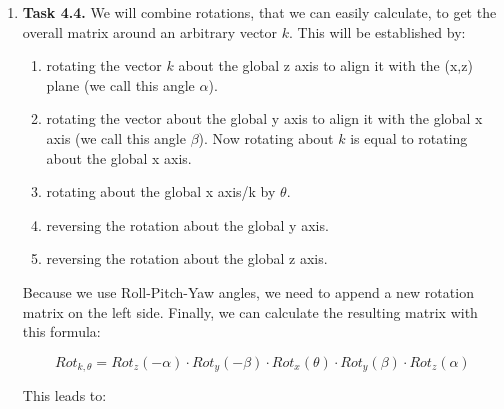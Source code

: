 \documentclass[a4paper,11pt]{article}
\begin{document}
\begin {enumerate}
	\item[\textbf{Task 4.4.}]
		We will combine rotations, that we can easily calculate, to get the overall matrix around an arbitrary vector $k$. This will be established by:
		\begin{enumerate}
			\item rotating the vector $k$ about the global z axis to align it with the (x,z) plane (we call this angle $\alpha$).
			\item rotating the vector about the global y axis to align it with the global x axis (we call this angle $\beta$). Now rotating about $k$ is equal to rotating about the global x axis.
			\item rotating about the global x axis/k by $\theta$.
			\item reversing the rotation about the global y axis.
			\item reversing the rotation about the global z axis.
		\end{enumerate}
		
		Because we use Roll-Pitch-Yaw angles, we need to append a new rotation matrix on the left side.	 Finally, we can calculate the resulting matrix with this formula:
		
		$$Rot_{k, \theta} = Rot_{z}(-\alpha) \cdot Rot_{y}(-\beta) \cdot Rot_{x}(\theta) \cdot Rot_{y}(\beta) \cdot Rot_{z}(\alpha)$$
		
		This leads to:
		

\end{enumerate}
\end{document}
